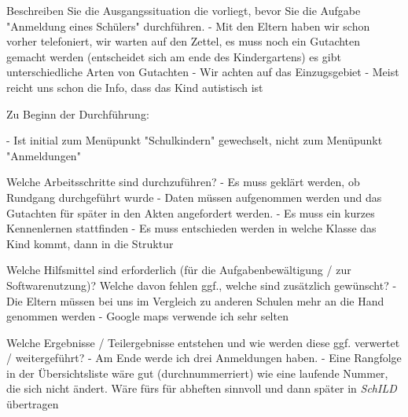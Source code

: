 Beschreiben Sie die Ausgangssituation die vorliegt, bevor Sie die Aufgabe "Anmeldung eines Schülers" durchführen.		
- Mit den Eltern haben wir schon vorher telefoniert, wir warten auf den Zettel, es muss noch ein Gutachten gemacht werden (entscheidet sich am ende des Kindergartens) es gibt unterschiedliche Arten von Gutachten
- Wir achten auf das Einzugsgebiet
- Meist reicht uns schon die Info, dass das Kind autistisch ist						















Zu Beginn der Durchführung:		


- Ist initial zum Menüpunkt "Schulkindern" gewechselt, nicht zum Menüpunkt "Anmeldungen"








Welche Arbeitsschritte sind durchzuführen?		
- Es muss geklärt werden, ob Rundgang durchgeführt wurde
- Daten müssen aufgenommen werden und das Gutachten für später in den Akten angefordert werden.
- Es muss ein kurzes Kennenlernen stattfinden
- Es muss entschieden werden in welche Klasse das Kind kommt, dann in die Struktur




Welche Hilfsmittel sind erforderlich (für die Aufgabenbewältigung / zur Softwarenutzung)? Welche davon fehlen ggf., welche sind zusätzlich gewünscht?
- Die Eltern müssen bei uns im Vergleich zu anderen Schulen mehr an die Hand genommen werden
- Google maps verwende ich sehr selten















Welche Ergebnisse / Teilergebnisse entstehen und wie werden diese ggf. verwertet / weitergeführt?		
- Am Ende werde ich drei Anmeldungen haben.
- Eine Rangfolge in der Übersichtsliste wäre gut (durchnummerriert) wie eine laufende Nummer, die sich nicht ändert. Wäre fürs für abheften sinnvoll und dann später in \textit{SchILD} übertragen







